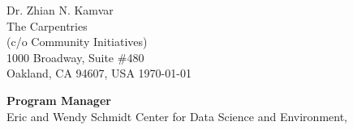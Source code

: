 


\clearpage
\begin{flushright}
  Dr. Zhian N. Kamvar\\
  The Carpentries\\
  (c/o Community Initiatives)\\
  1000 Broadway, Suite \#480\\
  Oakland, CA 94607, USA
  \today
\end{flushright}

\textbf{Program Manager}\\
Eric and Wendy Schmidt Center for Data Science and Environment,


%

